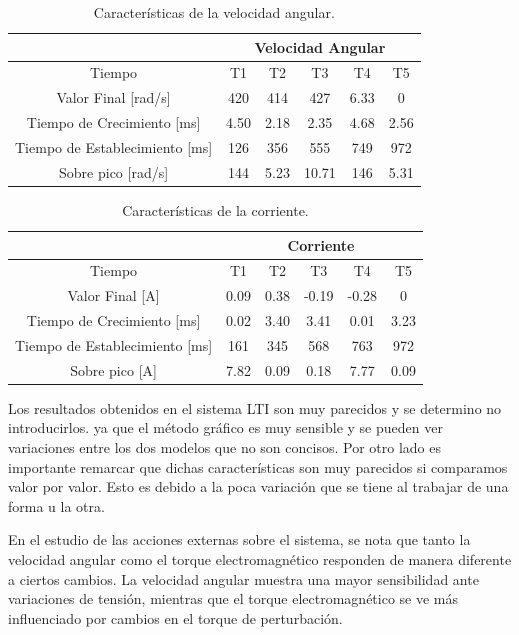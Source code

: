 \documentclass{article}
\begin{document}
\begin{table}[H]
    \centering
    \begin{tabular}{|c|c|c|c|c|c|}
        \hline
        & \multicolumn{5}{c|}{Velocidad Angular} \\
        \hline
        Tiempo & T1 & T2 & T3 & T4 & T5 \\
        \hline
        Valor Final [rad/s] & 420 & 414 & 427 & 6.33 & 0 \\
        \hline
        Tiempo de Crecimiento [ms] & 4.50 & 2.18 & 2.35 & 4.68 & 2.56 \\
        \hline
        Tiempo de Establecimiento [ms] & 126 & 356 & 555 & 749 & 972 \\
        \hline
        Sobre pico [rad/s] & 144 & 5.23 & 10.71 & 146 & 5.31 \\
        \hline
    \end{tabular}
    \caption{Características de la velocidad angular.}
\end{table}

\begin{table}[H]
    \centering
    \begin{tabular}{|c|c|c|c|c|c|}
        \hline
        & \multicolumn{5}{c|}{Corriente} \\
        \hline
        Tiempo & T1 & T2 & T3 & T4 & T5 \\
        \hline
        Valor Final [A]& 0.09 & 0.38 & -0.19 & -0.28 & 0 \\
        \hline
        Tiempo de Crecimiento [ms] & 0.02 & 3.40 & 3.41 & 0.01 & 3.23 \\
        \hline
        Tiempo de Establecimiento [ms] & 161 & 345 & 568 & 763 & 972 \\
        \hline
        Sobre pico [A] & 7.82 & 0.09 & 0.18 & 7.77 & 0.09 \\
        \hline
    \end{tabular}
    \caption{Características de la corriente.}
\end{table}

Los resultados obtenidos en el sistema LTI son muy parecidos y se determino no introducirlos. ya 
que el método gráfico es muy sensible y se pueden ver variaciones entre los dos modelos que no 
son concisos. Por otro lado es importante remarcar que dichas características son muy parecidos 
si comparamos valor por valor. Esto es debido a la poca variación que se tiene al trabajar de una 
forma u la otra. 

En el estudio de las acciones externas sobre el sistema, se nota que tanto la velocidad angular como 
el torque electromagnético responden de manera diferente a ciertos cambios. La velocidad angular
muestra una mayor sensibilidad ante variaciones de tensión, mientras que el torque electromagnético 
se ve más influenciado por cambios en el torque de perturbación.
\end{document}
